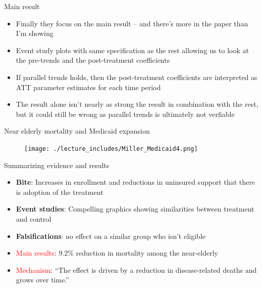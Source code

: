 \documentclass{beamer}
\begin{document}
\begin{frame}{Main result}

\begin{itemize}

\item Finally they focus on the main result -- and there's more in the paper than I'm showing
\item Event study plots with same specification as the rest allowing us to look at the pre-trends and the post-treatment coefficients
\item If parallel trends holds, then the post-treatment coefficients are interpreted as ATT parameter estimates for each time period
\item The result alone isn't nearly as strong the result in combination with the rest, but it could still be wrong as parallel trends is ultimately not verfiable
\end{itemize}

\end{frame}



\begin{frame}{Near elderly mortality and Medicaid expansion}

	\begin{figure}
	\texttt{[image: ./lecture\_includes/Miller\_Medicaid4.png]}
	\end{figure}

\end{frame}

\begin{frame}{Summarizing evidence and results}

\begin{itemize}
\item \textbf{Bite}: Increases in enrollment and reductions in uninsured support that there is adoption of the treatment
\item \textbf{Event studies}: Compelling graphics showing similarities between treatment and control
\item \textbf{Falsifications}: no effect on a similar group who isn't eligible
\item \textcolor{red}{Main results}: 9.2\% reduction in mortality among the near-elderly
\item \textcolor{red}{Mechanism}: ``The effect is driven by a reduction in disease-related deaths and grows over time.''
\end{itemize}

\end{frame}
\end{document}
